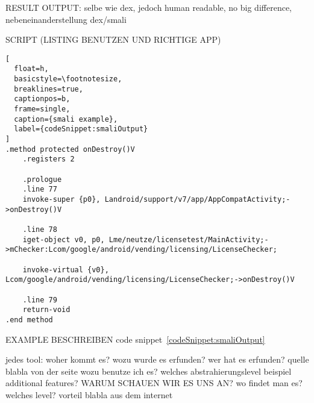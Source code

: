 RESULT OUTPUT:
selbe wie dex, jedoch human readable, no big difference, nebeneinanderstellung dex/smali

SCRIPT (LISTING BENUTZEN UND RICHTIGE APP)


\begin{lstlisting}[
  float=h,
  basicstyle=\footnotesize,
  breaklines=true,
  captionpos=b,
  frame=single,
  caption={smali example},
  label={codeSnippet:smaliOutput}
]
.method protected onDestroy()V
    .registers 2

    .prologue
    .line 77
    invoke-super {p0}, Landroid/support/v7/app/AppCompatActivity;->onDestroy()V

    .line 78
    iget-object v0, p0, Lme/neutze/licensetest/MainActivity;->mChecker:Lcom/google/android/vending/licensing/LicenseChecker;

    invoke-virtual {v0}, Lcom/google/android/vending/licensing/LicenseChecker;->onDestroy()V

    .line 79
    return-void
.end method
\end{lstlisting}
EXAMPLE BESCHREIBEN code snippet~\ref{codeSnippet:smaliOutput}

jedes tool:\newline
woher kommt es?\newline
wozu wurde es erfunden?\newline
wer hat es erfunden? quelle\newline
blabla von der seite\newline
wozu benutze ich es?\newline
welches abstrahierungslevel\newline
beispiel\newline
additional features?\newline
WARUM SCHAUEN WIR ES UNS AN?\newline
wo findet man es?\newline
welches level?\newline
vorteil\newline
blabla aus dem internet\newline
